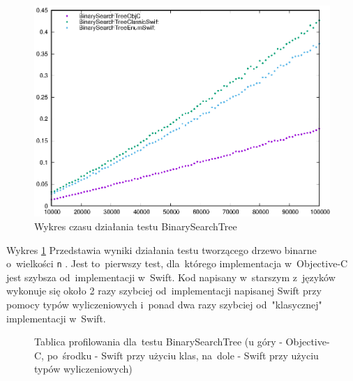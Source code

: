 \documentclass[mgr, shortabstract]{iithesis}
\newcommand{\swiftinline}[1]{
    \texttt{#1}
}
\begin{document}
\begin{figure}
    \includegraphics{plots/BinarySearchTree.eps}
    \caption{Wykres czasu działania testu BinarySearchTree}
    \label{p:binary_search}
\end{figure}

Wykres \ref{p:binary_search} Przedstawia wyniki działania testu tworzącego drzewo binarne o~wielkości \swiftinline{n}. Jest to~pierwszy test, dla~którego implementacja w~Objective-C jest szybsza od~implementacji w~Swift. Kod napisany w~starszym z~języków wykonuje się około 2 razy szybciej od~implementacji napisanej Swift przy pomocy typów wyliczeniowych i~ponad dwa razy szybciej od~"klasycznej" implementacji w~Swift. 

\begin{figure}
    \caption{Tablica profilowania dla~testu BinarySearchTree (u góry - Objective-C, po~środku - Swift przy użyciu klas, na~dole - Swift przy użyciu typów wyliczeniowych)}
    \label{i:binary_search}
\end{figure}
\end{document}
